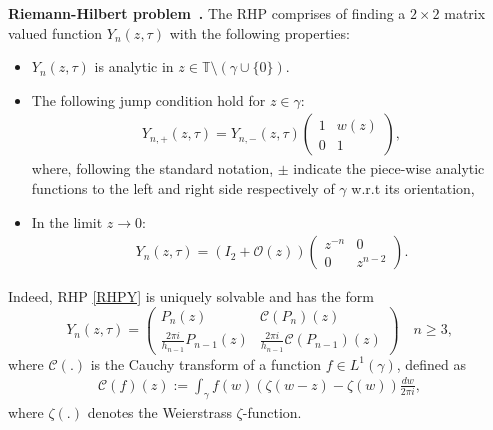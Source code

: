 \documentclass[11pt,a4paper]{article}
\theoremstyle{definition}
\numberwithin{equation}{section}
\numberwithin{theorem}{section}
\newcounter{rhp}
\newenvironment{rhp}[1][]{\refstepcounter{rhp}\par\medskip
   \noindent \textbf{Riemann-Hilbert problem~\therhp. #1} \rmfamily}{\medskip}
\begin{document}
\begin{rhp}\label{RHPY}
The RHP comprises of finding a $2\times 2$ matrix valued function $Y_n(z,\tau)$ with the following properties:
\begin{itemize}
    \item $Y_n(z,\tau)$ is analytic in $z\in \mathbb{T}\setminus ( \gamma \cup \{0\} )$.
    \item The following jump condition hold for $z\in \gamma$:
    \begin{align}\label{jump:Yn}
        Y_{n,+}(z,\tau) = Y_{n,-}(z,\tau) \left(\begin{array}{cc}
          1   &  w(z)\\
          0   & 1
        \end{array} \right),
    \end{align}
    where, following the standard notation,
    $\pm$ indicate the piece-wise analytic functions to the left and right side respectively of $\gamma$ w.r.t its orientation,
    \item In the limit $z\to 0$:
    \begin{align}
        Y_n(z,\tau)=\left( I_2 + \mathcal{O}(z) \right) \left( \begin{array}{cc}
         z^{-n}    & 0 \\
           0  & z^{n-2}
        \end{array}\right).
    \end{align}
\end{itemize}
\end{rhp}
Indeed, RHP \ref{RHPY} is uniquely solvable and has the form
\begin{equation}\label{RHPsol}
    Y_{n}(z,\tau)=\begin{pmatrix}
        P_n(z)& \mathcal{C}( P_n)(z)\\
        \frac{2\pi i}{h_{n-1}}  P_{n-1}(z)& \frac{2\pi i}{h_{n-1}}\mathcal{C}( P_{n-1})(z)
    \end{pmatrix} \quad n\geq 3,
\end{equation}
where $\mathcal{C}(.)$ is the Cauchy transform of a function $f\in L^1(\gamma)$, defined as
\begin{align*}
     \mathcal{C}(f)(z):= \int_{\gamma} f(w)(\zeta(w-z)-\zeta(w))\frac{dw}{2\pi i},
\end{align*}
 where $\zeta(.)$ denotes the Weierstrass $\zeta$-function. 
\end{document}
